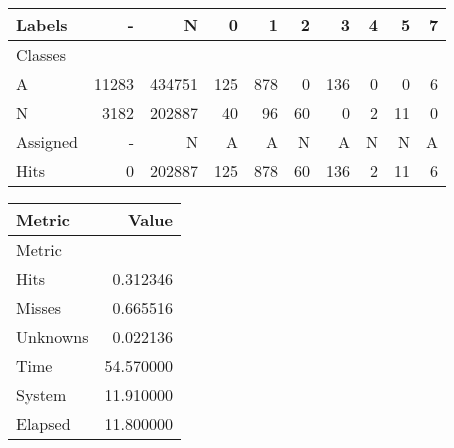 \begin{tabular}{l|r|r|r|r|r|r|r|r|r}

Labels &      - &       N &    0 &    1 &   2 &    3 &  4 &   5 &  7 \\\hline
Classes  &        &         &      &      &     &      &    &     &    \\\hline
\hline
A        &  11283 &  434751 &  125 &  878 &   0 &  136 &  0 &   0 &  6 \\\hline
N        &   3182 &  202887 &   40 &   96 &  60 &    0 &  2 &  11 &  0 \\\hline
\hline
Assigned &      - &       N &    A &    A &   N &    A &  N &   N &  A \\\hline
Hits     &      0 &  202887 &  125 &  878 &  60 &  136 &  2 &  11 &  6 
\end{tabular}
\begin{tabular}{l|r}

Metric   &      Value \\\hline
Metric   &            \\\hline
\hline
Hits     &   0.312346 \\\hline
Misses   &   0.665516 \\\hline
Unknowns &   0.022136 \\\hline
Time     &  54.570000 \\\hline
System   &  11.910000 \\\hline
Elapsed  &  11.800000 
\end{tabular}

